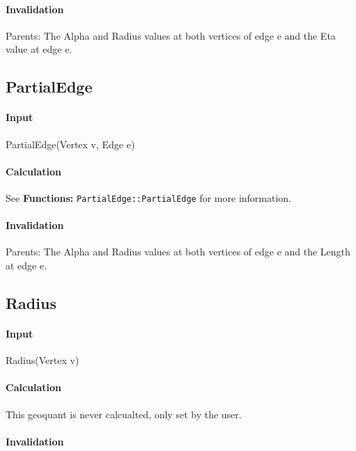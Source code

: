 \paragraph{Invalidation}

\bigskip Parents: The Alpha and Radius values at both vertices of edge e and
the Eta value at edge e.

\subsection{PartialEdge}

\paragraph{Input}

PartialEdge(Vertex v, Edge e)

\paragraph{Calculation}

See \textbf{Functions: }\texttt{PartialEdge::PartialEdge} for more
information.

\paragraph{Invalidation}

\bigskip Parents: The Alpha and Radius values at both vertices of edge e and
the Length at edge e.

\subsection{Radius}

\paragraph{Input}

Radius(Vertex v)

\paragraph{Calculation}

This geoquant is never calcualted, only set by the user.

\paragraph{Invalidation}

